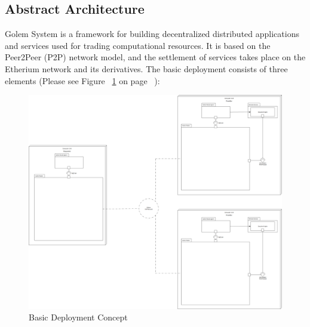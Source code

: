 
\subsection{Abstract Architecture}

Golem System is a framework for building decentralized distributed applications and services used for trading computational resources.
It is based on the Peer2Peer (P2P) network model, and the settlement of services takes place on the Etherium network and its derivatives.
The basic deployment consists of three elements (Please see Figure ~\ref{fig:BDC} on page ~\pageref{fig:BDC}):

\begin{figure}[H]
    \centering
    \includegraphics[width=12cm,angle=0]{./diag/Abstract/BasicDeployment-Abstract.png}
    \caption{Basic Deployment Concept}
	\label{fig:BDC}
\end{figure}


